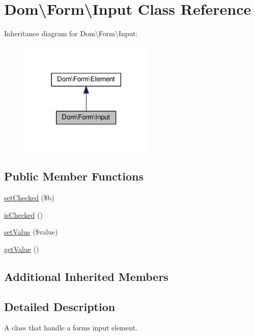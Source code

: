 \hypertarget{classDom_1_1Form_1_1Input}{\section{Dom\textbackslash{}Form\textbackslash{}Input Class Reference}
\label{classDom_1_1Form_1_1Input}
}


Inheritance diagram for Dom\textbackslash{}Form\textbackslash{}Input\+:\nopagebreak
\begin{figure}[H]
\begin{center}
\leavevmode
\includegraphics[width=182pt]{classDom_1_1Form_1_1Input__inherit__graph}
\end{center}
\end{figure}
\subsection*{Public Member Functions}
\begin{DoxyCompactItemize}
\item 
\hyperlink{classDom_1_1Form_1_1Input_a940675b13cb6baf05601e0880072bc5b}{set\+Checked} (\$b)
\item 
\hyperlink{classDom_1_1Form_1_1Input_aa822b93411df7db86d6bc0d99a255140}{is\+Checked} ()
\item 
\hyperlink{classDom_1_1Form_1_1Input_a95beded58548822c685f18df625eee88}{set\+Value} (\$value)
\item 
\hyperlink{classDom_1_1Form_1_1Input_a9f426e01159412d88c6ed1ac3d71d883}{get\+Value} ()
\end{DoxyCompactItemize}
\subsection*{Additional Inherited Members}


\subsection{Detailed Description}
A class that handle a forms input element.

